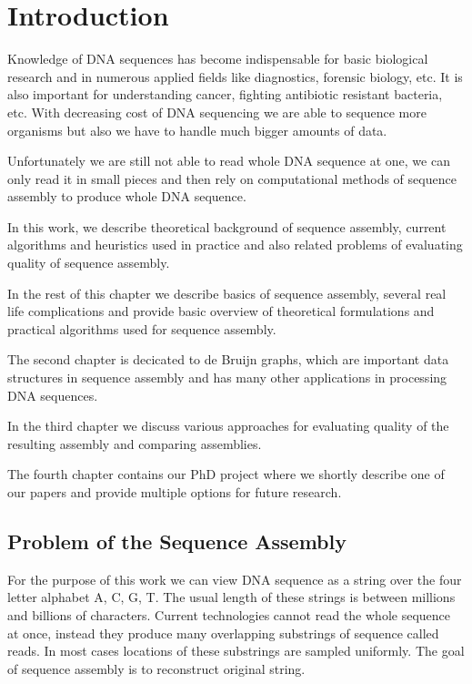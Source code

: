 \chapter{Introduction}

Knowledge of DNA sequences has become indispensable for basic biological research
and in numerous applied fields like diagnostics, forensic biology, etc.
It is also important for understanding cancer, fighting antibiotic resistant bacteria, etc.
With decreasing cost of DNA sequencing we are able to sequence more organisms
but also we have to handle much bigger amounts of data. 

Unfortunately we are still not able to read whole DNA sequence at one, we can only
read it in small pieces and then rely on computational methods of sequence assembly
to produce whole DNA sequence.

In this work, we describe theoretical background of sequence assembly,
current algorithms and heuristics used in practice and also related 
problems of evaluating quality of sequence assembly.

In the rest of this chapter we describe basics of sequence assembly,
several real life complications and provide basic overview of theoretical
formulations and practical algorithms used for sequence assembly.

The second chapter is decicated to de Bruijn graphs, which
are important data structures in sequence assembly and has many other
applications in processing DNA sequences.

In the third chapter we discuss various approaches for evaluating
quality of the resulting assembly and comparing assemblies.

The fourth chapter contains our PhD project where we
shortly describe one of our papers and provide multiple
options for future research.


\section{Problem of the Sequence Assembly}

For the purpose of this work we can view DNA sequence as a string over the
four letter alphabet A, C, G, T. The usual length of these strings
is between millions and billions of characters.
Current technologies cannot read the whole sequence at once, instead they produce many
overlapping substrings of sequence called reads.
In most cases locations of these substrings are sampled uniformly.
The goal of sequence assembly is to reconstruct original string.

